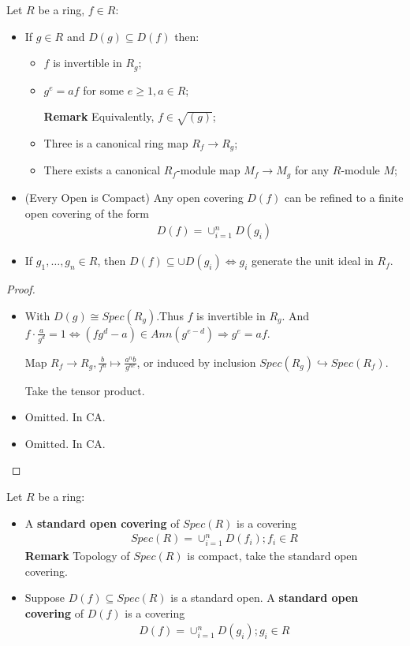 \documentclass[Total.tex]{subfiles}
\begin{document}
			\begin{lemma}
				Let $R$ be a ring, $f\in R$:
				
				\begin{itemize}
					\item If $g\in R$ and $D(g)\subseteq D(f)$ then:
					\begin{itemize}
						\item $f$ is invertible in $R_g$;
						\item $g^e=af$ for some $e\geq 1,a\in R$;
						
						\textbf{Remark} Equivalently, $f\in \sqrt{(g)}$;
						
						\item Three is a canonical ring map $R_f\rightarrow R_g$;
						\item There exists a canonical $R_f$-module map $M_f\rightarrow M_g$ for any $R$-module $M$;
					\end{itemize}
					\item (Every Open is Compact) Any open covering $D(f)$ can be refined to a finite open covering of the form
					\begin{gather*}
						D(f)=\cup_{i=1}^n D(g_i)
					\end{gather*}
					\item If $g_1,\dots,g_n\in R$, then $D(f)\subseteq \cup D(g_i)\Leftrightarrow g_i$ generate the unit ideal in $R_f$.
				\end{itemize}
			\end{lemma}
			
			\begin{proof}
				\begin{itemize}
					\item With $D(g)\cong Spec(R_g)$.Thus $f$ is invertible in $R_g$. And $f\cdot \frac{a}{g^d}=1\Leftrightarrow (fg^d-a)\in Ann(g^{e-d})\Rightarrow g^e=af$.
					
					Map $R_f\rightarrow R_g,\frac{b}{f^n}\mapsto \frac{a^nb}{g^{ne}}$, or induced by inclusion $Spec(R_g)\hookrightarrow Spec(R_f)$.
					
					Take the tensor product. 
					\item Omitted. In CA.
					\item Omitted. In CA.
				\end{itemize}
			\end{proof}
			\begin{Def}
				Let $R$ be a ring:
				\begin{itemize}
					\item A \textbf{standard open covering} of $Spec(R)$ is a covering
					\begin{gather*}
						Spec(R)=\cup_{i=1}^n D(f_i);f_i\in R
					\end{gather*}
					\textbf{Remark} Topology of $Spec(R)$ is compact, take the standard open covering.
					\item Suppose $D(f)\subseteq Spec(R)$ is a standard open. A \textbf{standard open covering} of $D(f)$ is a covering
					\begin{gather*}
						D(f)=\cup_{i=1}^n D(g_i);g_i\in R
					\end{gather*}
				\end{itemize}
			\end{Def}
			
\end{document}
